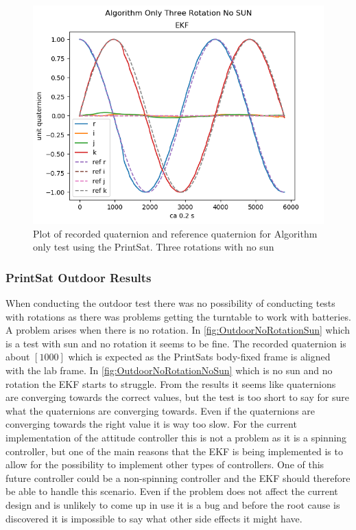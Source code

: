 \begin{figure}[tbp]
	\centering
	\includegraphics[width=1\columnwidth]{./Pictures/cdrRun3ThreeRotationsNoSun}
	\caption{Plot of recorded quaternion and reference quaternion for Algorithm only test using the PrintSat. Three rotations with  no sun}
	\label{fig:cdr3RotNoSun}
\end{figure}

\subsubsection{PrintSat Outdoor Results}
When conducting the outdoor test there was no possibility of conducting tests with rotations as there was problems getting the turntable to work with batteries. A problem arises when there is no rotation. In \autoref{fig:OutdoorNoRotationSun} which is a test with sun and no rotation it seems to be fine. The recorded quaternion is about $[1 0 0 0]$ which is expected as the PrintSats body-fixed frame is aligned with the lab frame. In \autoref{fig:OutdoorNoRotationNoSun} which is no sun and no rotation the EKF starts to struggle. From the results it seems like quaternions are converging towards the correct values, but the test is too short to say for sure what the quaternions are converging towards. Even if the quaternions are converging towards the right value it is way too slow. For the current implementation of the attitude controller this is not a problem as it is a spinning controller, but one of the main reasons that the EKF is being implemented is to allow for the possibility to implement other types of controllers. One of this future controller could be a non-spinning controller and the EKF should therefore be able to handle this scenario. Even if the problem does not affect the current design and is unlikely to come up in use it is a bug and before the root cause is discovered it is impossible to say what other side effects it might have.

